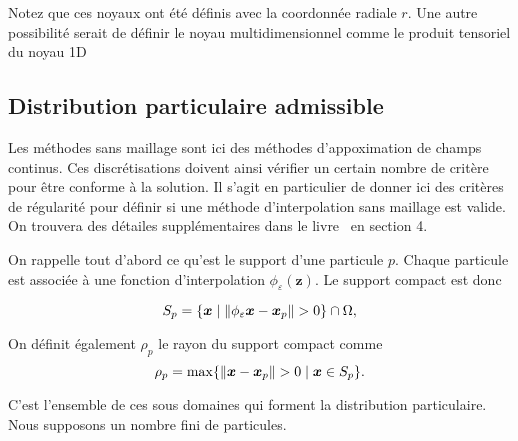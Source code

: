 Notez que ces noyaux ont été définis avec la coordonnée radiale $r$. Une autre possibilité serait de définir le noyau multidimensionnel comme le produit tensoriel du noyau 1D

\subsection{Distribution particulaire admissible}

Les méthodes sans maillage sont ici des méthodes d'appoximation de champs continus. Ces discrétisations doivent ainsi vérifier un certain nombre de critère pour être conforme à la solution. Il s'agit en particulier de donner ici des critères de régularité pour définir si une méthode d'interpolation sans maillage est valide. On trouvera des détailes supplémentaires dans le livre~\cite{s_li_meshfree_2004} en section 4.

On rappelle tout d'abord ce qu'est le support d'une particule $p$. Chaque particule est associée à une fonction d'interpolation $\phi_\varepsilon(\bm{z})$. Le support compact est donc

\begin{equation*}
    S_p = \{\bm{x} \mid \| \phi_\varepsilon \bm{x} - \bm{x}_p \| > 0\} \cap \Omega,
\end{equation*}

On définit également $\rho_p$ le rayon du support compact comme
\begin{equation*}
    \rho_p =  \max \{\| \bm{x} - \bm{x}_p \| > 0 \mid \bm{x} \in S_p\}.
\end{equation*}

C'est l'ensemble de ces sous domaines qui forment la distribution particulaire. Nous supposons un nombre fini de particules. %

